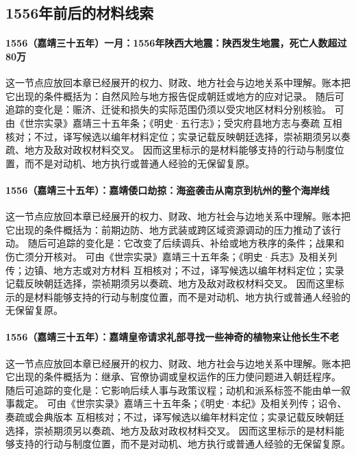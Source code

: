 \subsection{1556年前后的材料线索}

\paragraph{1556（嘉靖三十五年）一月：1556年陕西大地震：陕西发生地震，死亡人数超过80万} 这一节点应放回本章已经展开的权力、财政、地方社会与边地关系中理解。账本把它出现的条件概括为：自然风险与地方报告促成朝廷或地方的应对记录。 随后可追踪的变化是：赈济、迁徙和损失的实际范围仍须以受灾地区材料分别核验。 可由《世宗实录》嘉靖三十五年条；《明史·五行志》；受灾府县地方志与奏疏 互相核对；不过，译写候选以编年材料定位；实录记载反映朝廷选择，崇祯期须另以奏疏、地方及敌对政权材料交叉。 因而这里标示的是材料能够支持的行动与制度位置，而不是对动机、地方执行或普通人经验的无保留复原。

\paragraph{1556（嘉靖三十五年）：嘉靖倭口劫掠：海盗袭击从南京到杭州的整个海岸线} 这一节点应放回本章已经展开的权力、财政、地方社会与边地关系中理解。账本把它出现的条件概括为：前期边防、地方武装或跨区域资源调动的压力推动了该行动。 随后可追踪的变化是：它改变了后续调兵、补给或地方秩序的条件；战果和伤亡须分开核对。 可由《世宗实录》嘉靖三十五年条；《明史·兵志》及相关列传；边镇、地方志或对方材料 互相核对；不过，译写候选以编年材料定位；实录记载反映朝廷选择，崇祯期须另以奏疏、地方及敌对政权材料交叉。 因而这里标示的是材料能够支持的行动与制度位置，而不是对动机、地方执行或普通人经验的无保留复原。

\paragraph{1556（嘉靖三十五年）：嘉靖皇帝请求礼部寻找一些神奇的植物来让他长生不老} 这一节点应放回本章已经展开的权力、财政、地方社会与边地关系中理解。账本把它出现的条件概括为：继承、官僚协调或皇权运作的压力使问题进入朝廷程序。 随后可追踪的变化是：它影响后续人事与政策议程；动机和派系标签不能由单一叙事裁定。 可由《世宗实录》嘉靖三十五年条；《明史·本纪》及相关列传；诏令、奏疏或会典版本 互相核对；不过，译写候选以编年材料定位；实录记载反映朝廷选择，崇祯期须另以奏疏、地方及敌对政权材料交叉。 因而这里标示的是材料能够支持的行动与制度位置，而不是对动机、地方执行或普通人经验的无保留复原。

